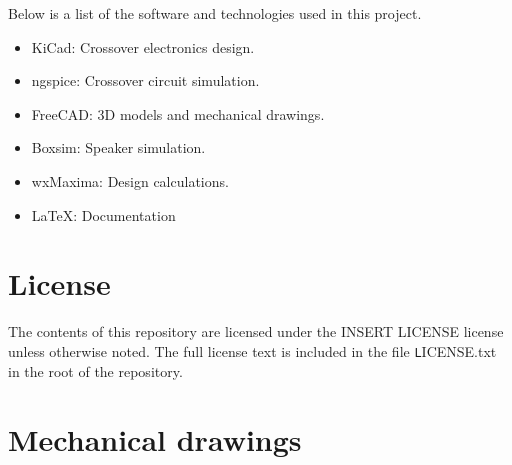 \documentclass[10pt]{article}
\begin{document}
Below is a list of the software and technologies used in this project.

\begin{itemize}
\item KiCad: Crossover electronics design.
\item ngspice: Crossover circuit simulation.
\item FreeCAD: 3D models and mechanical drawings.
\item Boxsim: Speaker simulation.
\item wxMaxima: Design calculations.
\item LaTeX: Documentation
\end{itemize}

\section{License}

\noindent The contents of this repository are licensed under the INSERT
LICENSE license unless otherwise noted. The full license text is included in
the file \texttt LICENSE.txt in the root of the repository.

\pagebreak
\null
\vfil
\centering\section{Mechanical drawings}
\vfil
\pagebreak




\end{document}
